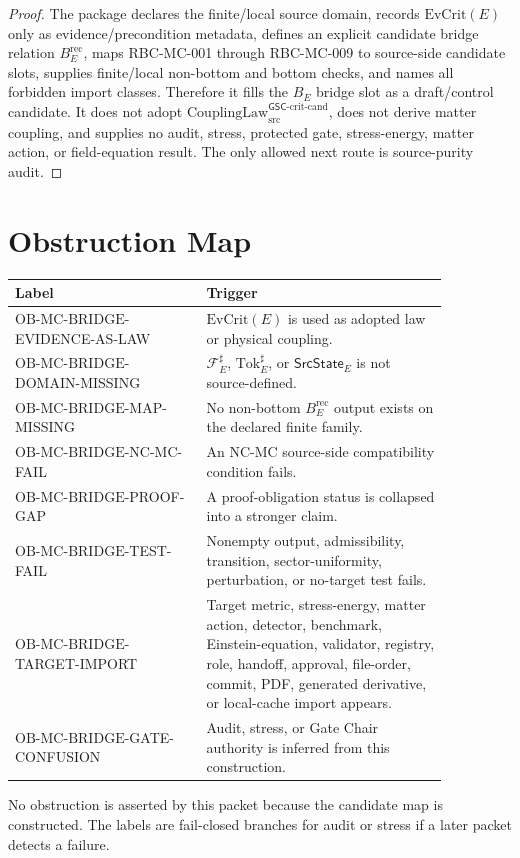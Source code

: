 \documentclass[11pt]{article}
\newcommand{\CouplingLawCrit}{\mathrm{CouplingLaw}^{\mathsf{GSC}\mbox{-}\mathrm{crit}\mbox{-}\mathrm{cand}}_{\mathrm{src}}}
\newcommand{\EvCrit}{\mathrm{EvCrit}}
\newcommand{\Tok}{\mathrm{Tok}}
\newcommand{\OBMCB}{\mathrm{OB}\mbox{-}\mathrm{MC}\mbox{-}\mathrm{BRIDGE}}
\begin{document}
\begin{proof}
The package declares the finite/local source domain, records
\(\EvCrit(E)\) only as evidence/precondition metadata, defines an explicit
candidate bridge relation \(B_E^{\mathrm{rec}}\), maps RBC-MC-001 through
RBC-MC-009 to source-side candidate slots, supplies finite/local non-bottom
and bottom checks, and names all forbidden import classes. Therefore it fills
the \(B_E\) bridge slot as a draft/control candidate. It does not adopt
\(\CouplingLawCrit\), does not derive matter coupling, and supplies no audit,
stress, protected gate, stress-energy, matter action, or field-equation
result. The only allowed next route is source-purity audit.
\end{proof}

\section{Obstruction Map}

\begin{longtable}{p{0.38\linewidth}p{0.48\linewidth}}
\toprule
Label & Trigger \\
\midrule
\(\OBMCB\)-EVIDENCE-AS-LAW &
\(\EvCrit(E)\) is used as adopted law or physical coupling. \\
\(\OBMCB\)-DOMAIN-MISSING &
\(\mathcal{F}_E^\sharp\), \(\Tok_E^\sharp\), or \(\mathsf{SrcState}_E\) is
not source-defined. \\
\(\OBMCB\)-MAP-MISSING &
No non-bottom \(B_E^{\mathrm{rec}}\) output exists on the declared finite
family. \\
\(\OBMCB\)-NC-MC-FAIL &
An NC-MC source-side compatibility condition fails. \\
\(\OBMCB\)-PROOF-GAP &
A proof-obligation status is collapsed into a stronger claim. \\
\(\OBMCB\)-TEST-FAIL &
Nonempty output, admissibility, transition, sector-uniformity, perturbation,
or no-target test fails. \\
\(\OBMCB\)-TARGET-IMPORT &
Target metric, stress-energy, matter action, detector, benchmark,
Einstein-equation, validator, registry, role, handoff, approval, file-order,
commit, PDF, generated derivative, or local-cache import appears. \\
\(\OBMCB\)-GATE-CONFUSION &
Audit, stress, or Gate Chair authority is inferred from this construction. \\
\bottomrule
\end{longtable}

No obstruction is asserted by this packet because the candidate map is
constructed. The labels are fail-closed branches for audit or stress if a
later packet detects a failure.
\end{document}
